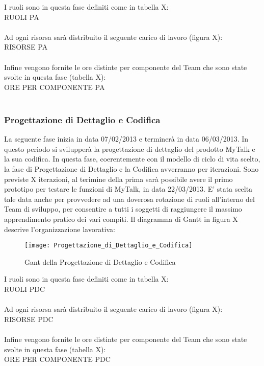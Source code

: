 I ruoli sono in questa fase definiti come in tabella X:\\
RUOLI PA\\\\
Ad ogni risorsa sarà distribuito il seguente carico di lavoro (figura X):\\
RISORSE PA\\\\
Infine vengono fornite le ore distinte per componente del Team che sono state svolte in questa fase (tabella X):\\
ORE PER COMPONENTE PA\\\\

\subsubsection{Progettazione di Dettaglio e Codifica}
La seguente fase inizia in data 07/02/2013 e terminerà in data 06/03/2013. In questo periodo si svilupperà la progettazione di dettaglio del prodotto MyTalk e la sua codifica.
In questa fase, coerentemente con il modello di ciclo di vita scelto, la fase di Progettazione di Dettaglio e la Codifica avverranno per iterazioni.
Sono previste X iterazioni, al terimine della prima sarà possibile avere il primo prototipo per testare le funzioni di MyTalk, in data 22/03/2013.
E' stata scelta tale data anche per provvedere ad una doverosa rotazione di ruoli all'interno del Team di sviluppo, per consentire a tutti i soggetti di raggiungere il massimo apprendimento pratico dei vari compiti.
Il diagramma di Gantt in figura X descrive l'organizzazione lavorativa:\\

\begin{figure}[h]
  \texttt{[image: Progettazione\_di\_Dettaglio\_e\_Codifica]}
\caption{Gant della Progettazione di Dettaglio e Codifica}
\end{figure}
I ruoli sono in questa fase definiti come in tabella X:\\
RUOLI PDC\\\\
Ad ogni risorsa sarà distribuito il seguente carico di lavoro (figura X):\\
RISORSE PDC\\\\
Infine vengono fornite le ore distinte per componente del Team che sono state svolte in questa fase (tabella X):\\
ORE PER COMPONENTE PDC\\\\

